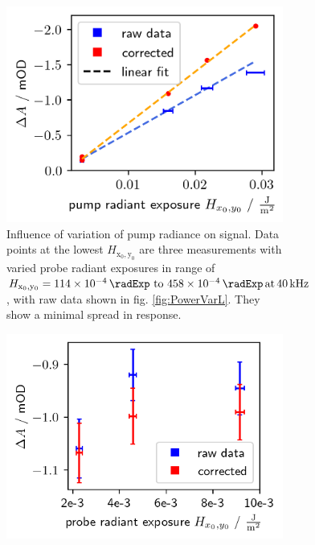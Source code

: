 \documentclass[twoside,openright,listof=numbered]{scrreprt}
\def\frep#1{\ensuremath{\,\mathrm{at}\, \SI{#1}{\kilo\hertz}}}
\def\radiantExp{\ensuremath{H_\mathrm{x_0,y_0}}}
\begin{document}
\begin{figure}[p]
\begin{subfigure}[t]{0.5\linewidth}
\centering
\includegraphics[width=\linewidth]{images/PowerVariationCorrectedPump.png}
\caption{Influence of variation of pump radiance on signal. Data points at the lowest $\radiantExp$ are three measurements with varied probe radiant exposures in range of $\radiantExp=\SIrange{114e-4}{458e-4}{\radExp}\frep{40}$, with raw data shown in fig. \ref{fig:PowerVarL}. They show a minimal spread in response.}
\end{subfigure}\hfill
\begin{subfigure}[t]{0.5\linewidth}
\centering
\includegraphics[width=\linewidth]{images/PowerVariationCorrectedProbe.png}

\end{subfigure}
\end{figure}
\end{document}

